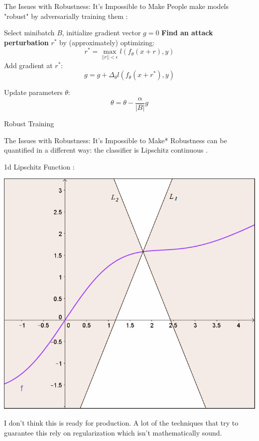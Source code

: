 \documentclass{beamer}
\begin{document}
\begin{frame}{The Issues with Robustness: It's Impossible to Make}
    People make models "robust" by adversarially training them \cite{adv_training}:

    \begin{algorithm}[H]
        \begin{algorithmic}[1]
            \STATE Select minibatch $B$, initialize gradient vector $g = 0$
                \STATE \textbf<2>{Find an attack perturbation} $r^*$ by (approximately) optimizing: $$ r^* = \max_{||r|| < \epsilon} l(f_\theta (x+r), y) $$
                \STATE Add gradient at $r^*$: $$g = g + \Delta_\theta l(f_\theta(x+ r^*), y)$$
            \ENDFOR


        \STATE Update parameters $\theta$: $$\theta = \theta - \frac{\alpha}{|B|}g$$
        \end{algorithmic}
        \caption{Robust Training}
        \label{alg:seq}
    \end{algorithm}
\end{frame}

\begin{frame}{The Issues with Robustness: It's Impossible to Make*}
    Robustness can be quantified in a different way: the classifier is Lipschitz continuous \cite{Lipschitz_robustness}.
    \begin{center}
        1d Lipschitz Function \cite{Lipschitz_diagram}:

        \includegraphics[scale=0.25]{lipschitz_diagram.png}

        I don't think this is ready for production. A lot of the techniques that try to guarantee this rely on regularization which isn't mathematically sound.
    \end{center}
\end{frame}
\end{document}
